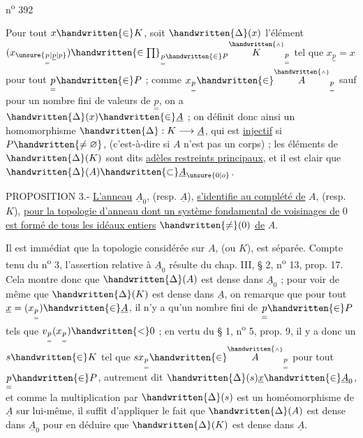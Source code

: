 \hfill n\textsuperscript{o} 392

Pour tout $x\handwritten{\in}K$, soit $\handwritten{\Delta}(x)$ l'élément $(x_{\unsure{\underset{=}{p}|\underline{p}|p}})\handwritten{\in\prod}_{\underset{=}{p}\handwritten{\in}P}\overset{\handwritten{\scriptscriptstyle\wedge}}{K}_{\underset{=}{p}}$ tel que $x_{\underset{=}{p}}=x$ pour tout $\underset{=}{p}\handwritten{\in}P$ ; comme $x_{\underset{=}{p}}\handwritten{\in}\overset{\handwritten{\scriptscriptstyle\wedge}}{A}_{\underset{=}{p}}$ sauf pour un nombre fini de valeurs de $\underset{=}{p}$, on a $\handwritten{\Delta}(x)\handwritten{\in}\underline{A}$ ; on définit donc ainsi un homomorphisme $\handwritten{\Delta}:K\longrightarrow \underline{A}$, qui est \uline{injectif} si $P\handwritten{\ne\varnothing}$, (c'est-à-dire si $A$ n'est pas un corps) ; les éléments de $\handwritten{\Delta}(K)$ sont dits \uline{adèles restreints principaux}, et il est clair que $\handwritten{\Delta}(A)\handwritten{\subset}\underline{A}_{\unsure{0|o}}$.

PROPOSITION 3.- \uline{L'anneau} $\underline{A}_0$, (resp. $\underline{A}$), \uline{s'identifie au complété de} $A$, (resp. $K$), \uline{pour la topologie d'anneau dont un système fondamental de voisinages de} $0$ \uline{est formé de tous les idéaux entiers} $\handwritten{\ne}(0)$ \uline{de} $A$.

Il est immédiat que la topologie considérée sur $A$, (ou $K$), est séparée. Compte tenu du n\textsuperscript{o} 3, l'assertion relative à $\underline{A}_0$ résulte du chap. III, § 2, n\textsuperscript{o} 13, prop. 17. Cela montre donc que $\handwritten{\Delta}(A)$ est dense dans $\underline{A}_0$ ; pour voir de même que $\handwritten{\Delta}(K)$ est dense dans $\underline{A}$, on remarque que pour tout $\underline{x}=(x_{\underset{=}{p}})\handwritten{\in}\underline{A}$, il n'y a qu'un nombre fini de $\underset{=}{p}\handwritten{\in}P$ tels que $v_{\underset{=}{p}}(x_{\underset{=}{p}})\handwritten{<}0$ ; en vertu du § 1, n\textsuperscript{o} 5, prop. 9, il y a donc un $s\handwritten{\in}K$ tel que $sx_{\underset{=}{p}}\handwritten{\in}\overset{\handwritten{\scriptscriptstyle\wedge}}{A}_{\underset{=}{p}}$ pour tout $\underset{=}{p}\handwritten{\in}P$, autrement dit $\handwritten{\Delta}(s)\underline{x}\handwritten{\in}\underline{A}_0$, et comme la multiplication par $\handwritten{\Delta}(s)$ est un homéomorphisme de $\underline{A}$ sur lui-même, il suffit d'appliquer le fait que $\handwritten{\Delta}(A)$ est dense dans $\underline{A}_0$ pour en déduire que $\handwritten{\Delta}(K)$ est dense dans $\underline{A}$.


